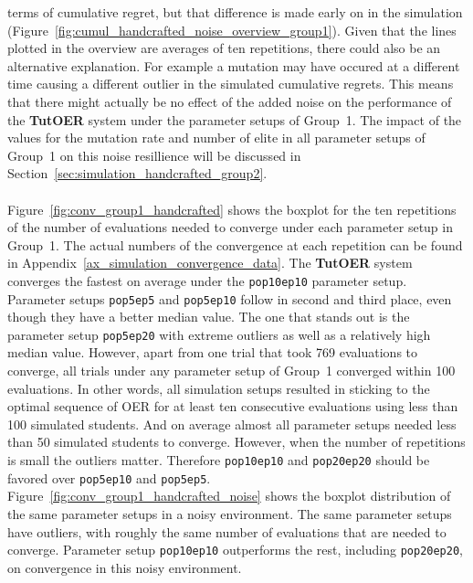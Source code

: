 terms of cumulative regret, but that difference is made early on in the
simulation (Figure~\ref{fig:cumul_handcrafted_noise_overview_group1}).
Given that the lines plotted in the overview are averages of ten repetitions,
there could also be an alternative explanation. For example a mutation may have
occured at a different time causing a different outlier in the simulated
cumulative regrets. This means that there might actually be no effect of the
added noise on the performance of the \textbf{TutOER} system under the parameter
setups of Group~1. The impact of the values for the mutation rate and
number of elite in all parameter setups of Group~1 on this noise resillience
will be discussed in Section~\ref{sec:simulation_handcrafted_group2}.\\\\
\noindent
Figure~\ref{fig:conv_group1_handcrafted} shows the boxplot for the ten
repetitions of the number of evaluations needed to converge under each
parameter setup in Group~1. The actual numbers of the convergence at each repetition
can be found in Appendix~\ref{ax_simulation_convergence_data}. The \textbf{TutOER} system
converges the fastest on average under the \texttt{pop10ep10} parameter setup.
Parameter setups \texttt{pop5ep5} and \texttt{pop5ep10} follow in second and third
place, even though they have a better median value. The one that stands out is
the parameter setup \texttt{pop5ep20} with extreme outliers as well as a
relatively high median value. However, apart from one trial that took 769
evaluations to converge, all trials under any parameter setup of Group~1
converged within 100 evaluations. In other words, all simulation setups
resulted in sticking to the optimal sequence of OER for at least ten
consecutive evaluations using less than 100 simulated students. And on average
almost all parameter setups needed less than 50 simulated students to
converge. However, when the number of repetitions is small the outliers matter.
Therefore \texttt{pop10ep10} and \texttt{pop20ep20} should be favored over
\texttt{pop5ep10} and \texttt{pop5ep5}. Figure~\ref{fig:conv_group1_handcrafted_noise}
shows the boxplot distribution of the same parameter setups in a noisy
environment. The same parameter setups have outliers, with roughly the same
number of evaluations that are needed to converge. Parameter setup
\texttt{pop10ep10} outperforms the rest, including \texttt{pop20ep20}, on convergence in
this noisy environment.
